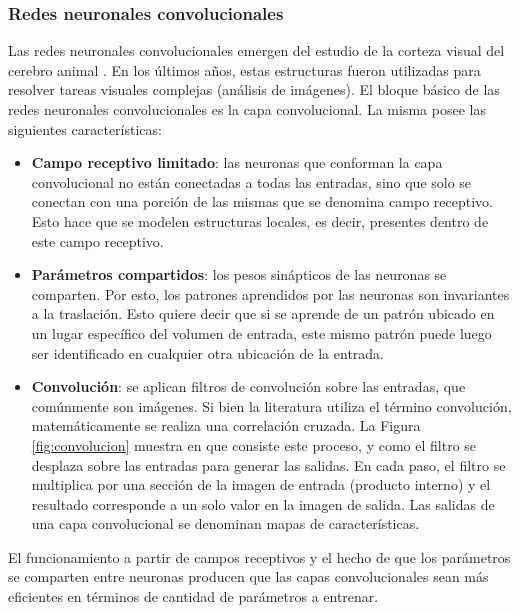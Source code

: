 \subsubsection{Redes neuronales convolucionales}

Las redes neuronales convolucionales emergen del estudio de la corteza visual del cerebro animal \cite{animales}. En los últimos años, estas estructuras fueron utilizadas para resolver tareas visuales complejas (análisis de imágenes). 
El bloque básico de las redes neuronales convolucionales es la capa convolucional. La misma posee las siguientes características:

\begin{itemize}

\item \textbf{Campo receptivo limitado}: las neuronas que conforman la capa convolucional no están conectadas a todas las entradas, sino que solo se conectan con una porción de las mismas que se denomina campo receptivo. Esto hace que se modelen estructuras locales, es decir, presentes dentro de este campo receptivo.  

\item \textbf{Parámetros compartidos}: los pesos sinápticos de las neuronas se comparten. Por esto, los patrones aprendidos por las neuronas son invariantes a la traslación. Esto quiere decir que si se aprende de un patrón ubicado en un lugar específico del volumen de entrada, este mismo patrón puede luego ser identificado en cualquier otra ubicación de la entrada.

\item \textbf{Convolución}: se aplican filtros de convolución sobre las entradas, que comúnmente son imágenes. Si bien la literatura utiliza el término convolución, matemáticamente se realiza una correlación cruzada. La Figura \ref{fig:convolucion} muestra en que consiste este proceso, y como el filtro se desplaza sobre las entradas para generar las salidas. En cada paso, el filtro se multiplica por una sección de la imagen de entrada (producto interno) y el resultado corresponde a un solo valor en la imagen de salida. Las salidas de una capa convolucional se denominan mapas de características.  

\end{itemize}


El funcionamiento a partir de campos receptivos y el hecho de que los parámetros se comparten entre neuronas producen que las capas convolucionales sean más eficientes en términos de cantidad de parámetros a entrenar. 


